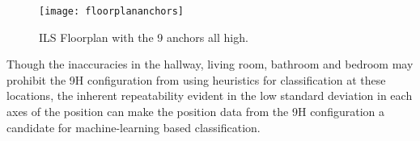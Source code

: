 \begin{figure}[ht]
    \centering
    \texttt{[image: floorplananchors]}
    \caption{ILS Floorplan with the 9 anchors all high.}
    \label{fig:anchorplacement}
\end{figure}

Though the inaccuracies in the hallway, living room, bathroom and bedroom may
prohibit the 9H configuration from using heuristics for classification at these 
locations, the inherent repeatability evident in the low standard deviation in 
each axes of the position can make the position data from the 9H configuration
a candidate for machine-learning based classification. 
